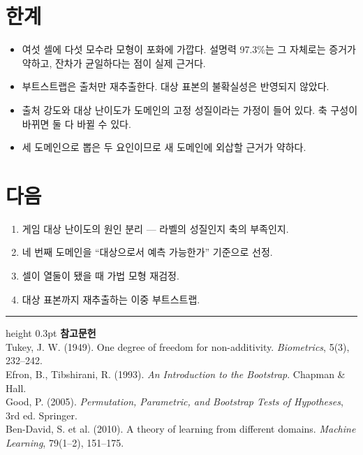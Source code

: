 \documentclass[10pt]{article}
\begin{document}
\section{한계}

\begin{itemize}[leftmargin=1.1em,itemsep=0.15em]
\item 여섯 셀에 다섯 모수라 모형이 포화에 가깝다. 설명력 97.3\%는 그 자체로는
      증거가 약하고, 잔차가 균일하다는 점이 실제 근거다.
\item 부트스트랩은 출처만 재추출한다. 대상 표본의 불확실성은 반영되지 않았다.
\item 출처 강도와 대상 난이도가 도메인의 고정 성질이라는 가정이 들어 있다.
      축 구성이 바뀌면 둘 다 바뀔 수 있다.
\item 세 도메인으로 뽑은 두 요인이므로 새 도메인에 외삽할 근거가 약하다.
\end{itemize}

\section{다음}

\begin{enumerate}[leftmargin=1.3em,itemsep=0.15em]
\item 게임 대상 난이도의 원인 분리 --- 라벨의 성질인지 축의 부족인지.
\item 네 번째 도메인을 ``대상으로서 예측 가능한가'' 기준으로 선정.
\item 셀이 열둘이 됐을 때 가법 모형 재검정.
\item 대상 표본까지 재추출하는 이중 부트스트랩.
\end{enumerate}

\vspace{0.6em}
\hrule height 0.3pt
\vspace{0.5em}
{\footnotesize
\textbf{참고문헌}\\[0.3em]
Tukey, J. W. (1949). One degree of freedom for non-additivity.
\emph{Biometrics}, 5(3), 232--242.\\[0.15em]
Efron, B., Tibshirani, R. (1993). \emph{An Introduction to the Bootstrap}.
Chapman \& Hall.\\[0.15em]
Good, P. (2005). \emph{Permutation, Parametric, and Bootstrap Tests of Hypotheses},
3rd ed. Springer.\\[0.15em]
Ben-David, S. et al. (2010). A theory of learning from different domains.
\emph{Machine Learning}, 79(1--2), 151--175.
}
\end{document}
